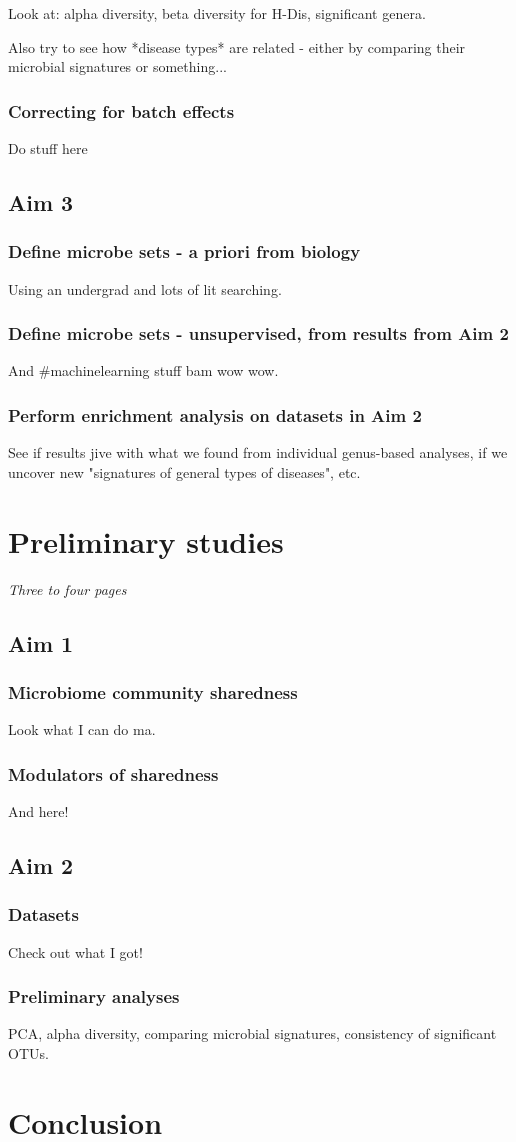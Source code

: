 \documentclass[12pt]{report}
\begin{document}
Look at: alpha diversity, beta diversity for H-Dis, significant genera.

Also try to see how *disease types* are related - either by comparing their microbial signatures or something...

\subsubsection*{Correcting for batch effects}
Do stuff here

\subsection*{Aim 3}

\subsubsection*{Define microbe sets - a priori from biology}
Using an undergrad and lots of lit searching.

\subsubsection*{Define microbe sets - unsupervised, from results from Aim 2}
And \#machinelearning stuff bam wow wow.

\subsubsection*{Perform enrichment analysis on datasets in Aim 2}
See if results jive with what we found from individual genus-based analyses, if we uncover new "signatures of general types of diseases", etc.

\section*{Preliminary studies}
\textit{Three to four pages}

\subsection*{Aim 1}
\subsubsection*{Microbiome community sharedness}
Look what I can do ma.

\subsubsection*{Modulators of sharedness}
And here!

\subsection*{Aim 2}
\subsubsection*{Datasets}
Check out what I got!
\subsubsection*{Preliminary analyses}
PCA, alpha diversity, comparing microbial signatures, consistency of significant OTUs.

\section*{Conclusion}
\end{document}
